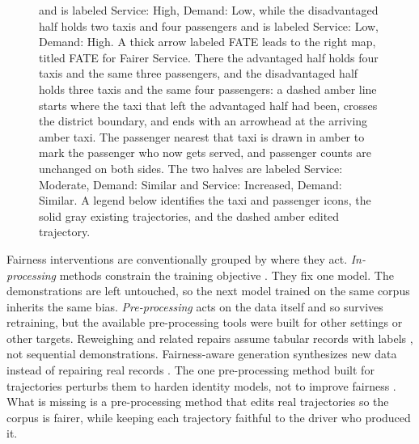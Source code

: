 \begin{figure}[t]
{  and is labeled Service: High, Demand: Low, while the disadvantaged half
  holds two taxis and four passengers and is labeled Service: Low, Demand:
  High. A thick arrow labeled FATE leads to the right map, titled FATE for
  Fairer Service. There the advantaged half holds four taxis and the same
  three passengers, and the disadvantaged half holds three taxis and the same
  four passengers: a dashed amber line starts where the taxi that left the
  advantaged half had been, crosses the district boundary, and ends
  with an arrowhead at the arriving amber taxi. The passenger nearest that taxi is drawn in
  amber to mark the passenger who now gets served, and passenger counts are
  unchanged on both sides. The two halves are labeled Service: Moderate,
  Demand: Similar and Service: Increased, Demand: Similar. A legend below
  identifies the taxi and passenger icons, the solid gray existing
  trajectories, and the dashed amber edited trajectory.}
  \label{fig:teaser}
\end{figure}

Fairness interventions are conventionally grouped by where they act.
\emph{In-processing} methods constrain the training objective
\cite{zheng2023,lamalfa2026fairppo,zhao2025fairdrlst}. They fix one model. The
demonstrations are left untouched, so the next model trained on the same corpus
inherits the same bias. \emph{Pre-processing} acts on the data itself
and so survives retraining, but the available pre-processing tools were built
for other settings or other targets. Reweighing and related repairs assume
tabular records with labels \cite{kamirancalders2012}, not sequential
demonstrations. Fairness-aware generation synthesizes new data instead of
repairing real records
\cite{xu2018fairgan,vanbreugel2021decaf,hastingsblow2025diffaug}. The one
pre-processing method built for trajectories perturbs them to harden identity
models, not to improve fairness \cite{hu2023stifgsm}. What is missing is a
pre-processing method that edits real trajectories so the corpus is fairer,
while keeping each trajectory faithful to the driver who produced it.

